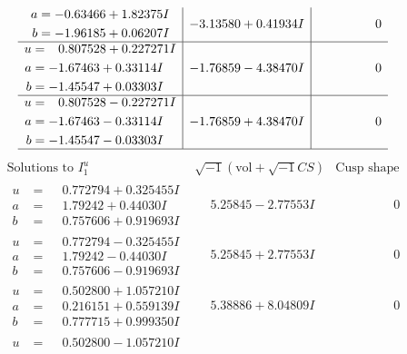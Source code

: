 \documentclass[1p]{elsarticle_modified}
\theoremstyle{definition}
\newcommand{\I}{\sqrt{-1}}
\begin{document}
$$\begin{array}{c|c|c}
\begin{aligned}
a &= -0.63466 + 1.82375 I \\
b &= -1.96185 + 0.06207 I\end{aligned}
 & -3.13580 + 0.41934 I & \phantom{-0.000000 } 0 \\ \hline\begin{aligned}
u &= \phantom{-}0.807528 + 0.227271 I \\
a &= -1.67463 + 0.33114 I \\
b &= -1.45547 + 0.03303 I\end{aligned}
 & -1.76859 - 4.38470 I & \phantom{-0.000000 } 0 \\ \hline\begin{aligned}
u &= \phantom{-}0.807528 - 0.227271 I \\
a &= -1.67463 - 0.33114 I \\
b &= -1.45547 - 0.03303 I\end{aligned}
 & -1.76859 + 4.38470 I & \phantom{-0.000000 } 0\\
 \hline 
 \end{array}$$\newpage$$\begin{array}{c|c|c}  
\text{Solutions to }I^u_{1}& \I (\text{vol} + \sqrt{-1}CS) & \text{Cusp shape}\\
 \hline 
\begin{aligned}
u &= \phantom{-}0.772794 + 0.325455 I \\
a &= \phantom{-}1.79242 + 0.44030 I \\
b &= \phantom{-}0.757606 + 0.919693 I\end{aligned}
 & \phantom{-}5.25845 - 2.77553 I & \phantom{-0.000000 } 0 \\ \hline\begin{aligned}
u &= \phantom{-}0.772794 - 0.325455 I \\
a &= \phantom{-}1.79242 - 0.44030 I \\
b &= \phantom{-}0.757606 - 0.919693 I\end{aligned}
 & \phantom{-}5.25845 + 2.77553 I & \phantom{-0.000000 } 0 \\ \hline\begin{aligned}
u &= \phantom{-}0.502800 + 1.057210 I \\
a &= \phantom{-}0.216151 + 0.559139 I \\
b &= \phantom{-}0.777715 + 0.999350 I\end{aligned}
 & \phantom{-}5.38886 + 8.04809 I & \phantom{-0.000000 } 0 \\ \hline\begin{aligned}
u &= \phantom{-}0.502800 - 1.057210 I \\

\end{aligned}
\end{array}$$
\end{document}
